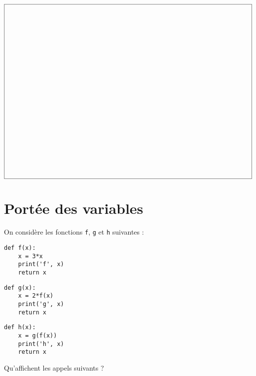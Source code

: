 \documentclass[11pt,a4paper]{article}
\begin{document}
$$\framebox[14.5cm]{$\rule{0cm}{10cm}$}$$

\newpage


\section{Portée des variables}
On considère les fonctions {\tt f}, {\tt g} et {\tt h} suivantes :
\begin{center}
\begin{py}{4cm}
\begin{verbatim}
def f(x):
    x = 3*x
    print('f', x)
    return x
\end{verbatim}
\end{py}\hspace*{1cm}
\begin{py}{4cm}
\begin{verbatim}
def g(x):
    x = 2*f(x)
    print('g', x)
    return x
\end{verbatim}
\end{py}\hspace*{1cm}
\begin{py}{4cm}
\begin{verbatim}
def h(x):
    x = g(f(x))
    print('h', x)
    return x
\end{verbatim}
\end{py}
\end{center}

Qu'affichent les appels suivants ?
\vspace*{2mm}
\end{document}

